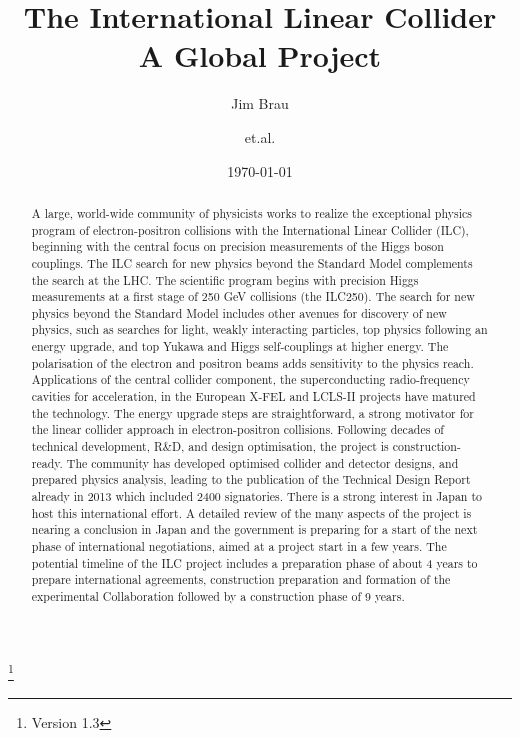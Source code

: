 \documentclass[%
 reprint,
 amsmath,amssymb,
 aps,
]{revtex4-1}
\begin{document}

\title{The International Linear Collider \\ A Global Project}%
\thanks{Version 1.3}%

\author{Jim Brau}
\author{et.al.}%
%


\date{\today}%

\begin{abstract}
A large, world-wide community of physicists works to realize
the exceptional physics program
of electron-positron collisions with the International Linear Collider (ILC),
beginning with the central focus on precision measurements of the Higgs boson
couplings.
The ILC search for new physics beyond the Standard Model
complements the search at the LHC.
The scientific program 
begins with precision Higgs measurements at a first stage 
of 250 GeV collisions (the ILC250).
The search for new physics beyond the Standard Model 
includes other avenues for discovery
of new physics, such as searches for light, weakly interacting particles,
top physics following an energy upgrade, and top Yukawa and Higgs self-couplings
at higher energy.  The polarisation of the electron and positron beams adds
sensitivity to the physics reach.  Applications of the central collider
component, the superconducting radio-frequency cavities for acceleration,
in the European X-FEL and LCLS-II projects have matured the technology.
The energy upgrade steps are straightforward, a strong
motivator for the linear collider approach in electron-positron collisions.
Following decades of technical development, R\&D,
and design optimisation, the project is construction-ready.  
The community has developed optimised collider and detector designs, and prepared
physics analysis, leading to the publication of the Technical Design Report
already in 2013 which included 2400 signatories.  There is a strong interest in Japan to host this
international effort.  A detailed review of the many aspects of the
project is nearing a conclusion in Japan and the government is preparing for
a start of the next phase of international negotiations, aimed at a project start in a few years. The potential timeline of the ILC project includes a preparation phase of about 4 years to prepare international agreements, construction preparation and formation of the experimental Collaboration followed by a construction phase of 9 years.

\end{abstract}
\end{document}
